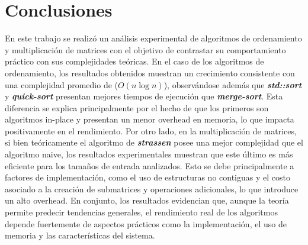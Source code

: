 \documentclass[11pt,spanish]{article} %
\begin{document}
\section{Conclusiones}
En este trabajo se realizó un análisis experimental de algoritmos de ordenamiento y multiplicación de matrices 
con el objetivo de contrastar su comportamiento práctico con sus complejidades teóricas. En el caso de los algoritmos 
de ordenamiento, los resultados obtenidos muestran un crecimiento consistente con una complejidad promedio de 
(\bm$O(n \log n)$), observándose además que \textbf{\textit{std::sort}} y \textbf{\textit{quick-sort}} presentan mejores tiempos de ejecución que \textbf{\textit{merge-sort}}.
 Esta diferencia se explica principalmente por el hecho de que los primeros son algoritmos in-place y presentan un 
menor overhead en memoria, lo que impacta positivamente en el rendimiento. Por otro lado, en la multiplicación de matrices, 
si bien teóricamente el algoritmo de \textbf{\textit{strassen}} posee una mejor complejidad que el algoritmo naive, los resultados 
experimentales muestran que este último es más eficiente para los tamaños de entrada analizados. Esto se debe principalmente 
a factores de implementación, como el uso de estructuras no contiguas y el costo asociado a la creación de submatrices y 
operaciones adicionales, lo que introduce un alto overhead. En conjunto, los resultados evidencian que, aunque la teoría 
permite predecir tendencias generales, el rendimiento real de los algoritmos depende fuertemente de aspectos prácticos como 
la implementación, el uso de memoria y las características del sistema.


\printbibliography
\end{document}
